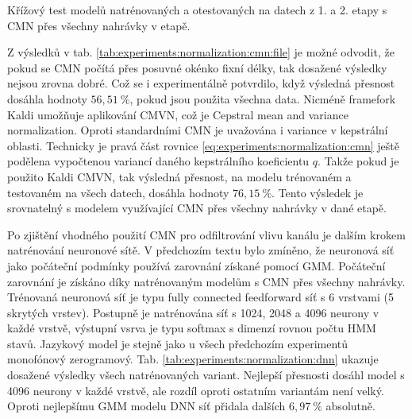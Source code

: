 \begin{table}[htpb]
  \centering
  \def\arraystretch{1.5}
  \caption{Křížový test modelů natrénovaných a otestovaných na datech z 1. a 2. etapy s CMN přes všechny nahrávky v etapě.}
  \label{tab:experiments:normalization:cmn:full}
\end{table}

Z výsledků v tab. \ref{tab:experiments:normalization:cmn:file} je možné odvodit, že pokud se CMN počítá přes posuvné okénko fixní délky, tak dosažené výsledky nejsou zrovna dobré. Což se i experimentálně potvrdilo, když výsledná přesnost dosáhla hodnoty $56,51\ \%$, pokud jsou použita všechna data. Nicméně framefork Kaldi umožňuje aplikování CMVN, což je Cepstral mean and variance normalization. Oproti standardními CMN je uvažována i variance v kepstrální oblasti. Technicky je pravá část rovnice \ref{eq:experiments:normalization:cmn} ještě podělena vypočtenou variancí daného kepstrálního koeficientu $q$. Takže pokud je použito Kaldi CMVN, tak výsledná přesnost, na modelu trénovaném a testovaném na všech datech, dosáhla hodnoty $76,15\ \%$. Tento výsledek je srovnatelný s modelem využívající CMN přes všechny nahrávky v dané etapě.

Po zjištění vhodného použití CMN pro odfiltrování vlivu kanálu je dalším krokem natrénování neuronové sítě. V předchozím textu bylo zmíněno, že neuronová síť jako počáteční podmínky používá zarovnání získané pomocí GMM. Počáteční zarovnání je získáno díky natrénovaným modelům s CMN přes všechny nahrávky. Trénovaná neuronová síť je typu fully connected feedforward síť s 6 vrstvami (5 skrytých vrstev). Postupně je natrénována síť s 1024, 2048 a 4096 neurony v každé vrstvě, výstupní vsrva je typu softmax s dimenzí rovnou počtu HMM stavů. Jazykový model je stejně jako u všech předchozím experimentů monofónový zerogramový. Tab. \ref{tab:experiments:normalization:dnn} ukazuje dosažené výsledky všech natrénovaných variant. Nejlepší přesnosti dosáhl model s 4096 neurony v každé vrstvě, ale rozdíl oproti ostatním variantám není velký. Oproti nejlepšímu GMM modelu DNN síť přidala dalších $6,97\ \%$ absolutně.

